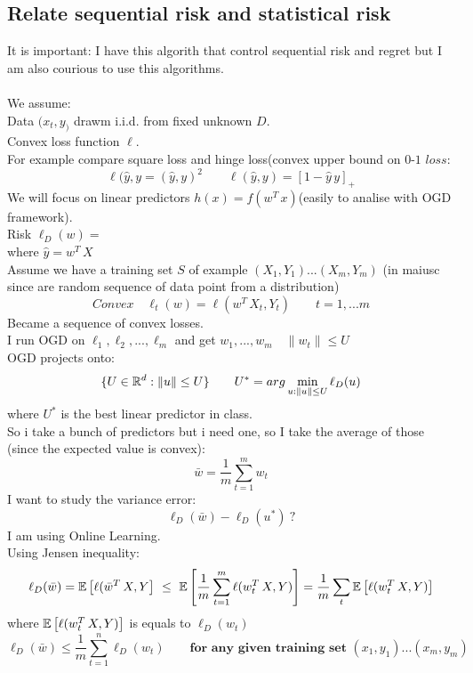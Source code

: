 \documentclass[../main.tex]{subfiles}
\begin{document}
\subsection{Relate sequential risk and statistical risk}
It is important: I have this algorith that control sequential risk and regret but I am also courious to use this algorithms. 
\\\\
We assume:\\
Data $(x_t,y_) $ drawm i.i.d. from fixed unknown $D$.
\\
Convex loss function $\ell$.
\\ For example compare square loss and hinge loss(convex upper bound on $0$-$1$ $loss$:
$$
\ell(\hat{y}, y = (\hat{y},y)^2 \qquad \ell(\hat{y},y) = \left[ 1- \hat{y} \, y \right]_+
$$
We will focus on linear predictors $h(x) = f(w^T \, x) $\quad (easily to analise with OGD framework).
\\
Risk $\ell_D(w) =$ 
\\
where $ \hat{y} = w^T \, X$
\\
Assume we have a training set $S$ of example $(X_1,Y_1)...(X_m,Y_m)$ \qquad (in maiusc since are random sequence of data point from a distribution)
\\
$$
Convex \quad \ell_t(w) = \ell(w^T \, X_t, Y_t) \qquad t= 1,...m
$$
Became a sequence of convex losses.
\\
I run OGD on $\ell_1,\ell_2,..., \ell_m$ and get $w_1,..., w_m \quad \|w_t\| \leq U$\\
OGD projects onto: $$\{ U \in \mathbb{R}^d : \| u \| \leq U \} \qquad U^* = arg \min_{u: \|u\| \leq U} \ell_D(u)$$
where $U^*$ is the best linear predictor in class.\\
So i take a bunch of predictors but i need one, so I take the average of those (since the expected value is convex):
$$
\bar{w} = \frac{1}{m}\sum_{t=1}^m w_t 
$$
I want to study the variance error:
$$
\ell_D(\bar{w}) - \ell_D(u^*) \ ?
$$
I am using Online Learning.
\\
Using Jensen inequality:
$$
\ell_D(\bar{w}) = \mathbb{E} \left[ \ell(\bar{w}^T \, X, Y  \right]  \ \leq \ \mathbb{E} \left[ \frac{1}{m} \sum_{t=1}^m \ell(w_t^T \, X, Y) \right] = \frac{1}{m} \sum_t \mathbb{E} \left[ \ell(w_t^T \, X, Y) \right]
$$
where $\mathbb{E} \left[ \ell(w_t^T \, X, Y) \right]$ is equals to  $\ell_D(w_t)$
\\
$$
\ell_D(\bar{w}) \leq \frac{1}{m} \sum_{t=1}^n \ell_D(w_t) \qquad \textbf{for any given training set } (x_1,y_1)...(x_m,y_m) \quad 
$$
\end{document}
